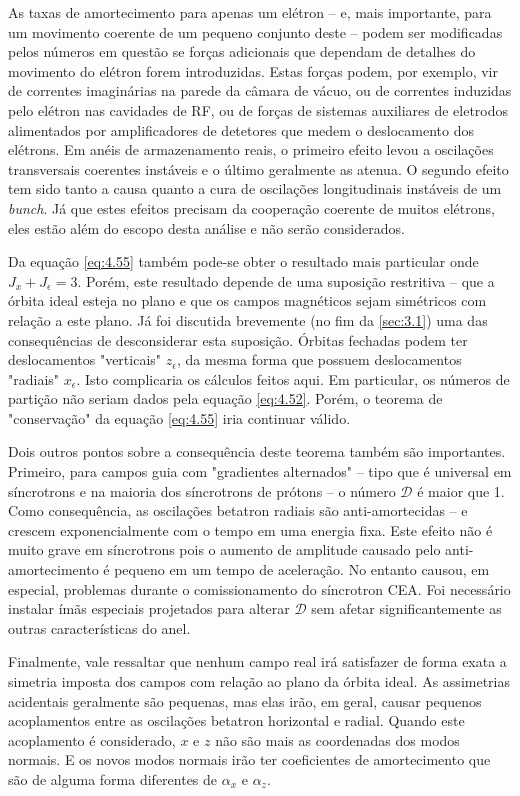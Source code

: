As taxas de amortecimento para apenas um elétron -- e, mais importante, para um movimento coerente de um pequeno conjunto deste -- podem ser modificadas pelos números em questão se forças adicionais que dependam de detalhes do movimento do elétron forem introduzidas. Estas forças podem, por exemplo, vir de correntes imaginárias na parede da câmara de vácuo, ou de correntes induzidas pelo elétron nas cavidades de RF, ou de forças de sistemas auxiliares de eletrodos alimentados por amplificadores de detetores  que medem o deslocamento dos elétrons. Em anéis de armazenamento reais, o primeiro efeito levou a oscilações transversais coerentes instáveis e o último geralmente as atenua. O segundo efeito tem sido tanto a causa quanto a cura de oscilações longitudinais instáveis de um \textit{bunch}. Já que estes efeitos precisam da cooperação coerente de muitos elétrons, eles estão além do escopo desta análise e não serão considerados.

Da equação \eqref{eq:4.55} também pode-se obter o resultado mais particular onde $J_x + J_\epsilon=3$. Porém, este resultado depende de uma suposição restritiva -- que a órbita ideal esteja no plano e que os campos magnéticos sejam simétricos com relação a este plano. Já foi discutida brevemente (no fim da \autoref{sec:3.1}) uma das consequências de desconsiderar esta suposição. Órbitas fechadas podem ter deslocamentos "verticais" $z_\epsilon$, da mesma forma que possuem deslocamentos "radiais" $x_\epsilon$. Isto complicaria os cálculos feitos aqui. Em particular, os números de partição não seriam dados pela equação \eqref{eq:4.52}. Porém, o teorema de "conservação" da equação \eqref{eq:4.55} iria continuar válido.

Dois outros pontos sobre a consequência deste teorema também são importantes. Primeiro, para campos guia com "gradientes alternados" -- tipo que é universal em síncrotrons e na maioria dos síncrotrons de prótons -- o número $\mathscr{D}$ é maior que 1. Como consequência, as oscilações betatron radiais são anti-amortecidas -- e crescem exponencialmente com o tempo em uma energia fixa. Este efeito não é muito grave em síncrotrons pois o aumento de amplitude causado pelo anti-amortecimento é pequeno em um tempo de aceleração. No entanto causou, em especial, problemas durante o comissionamento do síncrotron CEA. Foi necessário instalar ímãs especiais projetados para alterar $\mathscr{D}$ sem afetar significantemente as outras características do anel.

Finalmente, vale ressaltar que nenhum campo real irá satisfazer de forma exata a simetria imposta dos campos com relação ao plano da órbita ideal. As assimetrias acidentais geralmente são pequenas, mas elas irão, em geral, causar pequenos acoplamentos entre as oscilações betatron horizontal e radial. Quando este acoplamento é considerado, $x$ e $z$ não são mais as coordenadas dos modos normais. E os novos modos normais irão ter coeficientes de amortecimento que são de alguma forma diferentes de $\alpha_x$ e $\alpha_z$.
